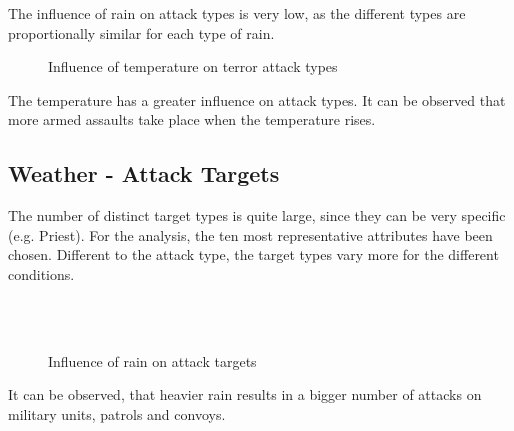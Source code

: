 The influence of rain on attack types is very low, as the different types are proportionally similar for each type of rain.

\newpage

\begin{figure}[!hbt]
\centering
    \qquad
    \qquad
    \qquad
    \qquad
    \qquad
\caption{Influence of temperature on terror attack types}
\label{fig:example subfigure}
\end{figure}

The temperature has a greater influence on attack types. It can be observed that more armed assaults take place when the temperature rises.

\newpage

\subsection{Weather - Attack Targets}
The number of distinct target types is quite large, since they can be very specific (e.g. Priest). For the analysis, the ten most representative attributes have been chosen. Different to the attack type, the target types vary more for the different conditions.

\begin{figure}[!ht]
\centering
    \qquad\\
    \qquad
    \qquad\\
    \qquad
\caption{Influence of rain on attack targets}
\end{figure}

It can be observed, that heavier rain results in a bigger number of attacks on military units, patrols and convoys.


